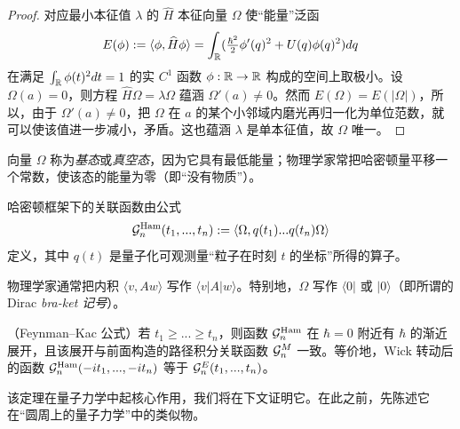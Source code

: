 \begin{proof} 对应最小本征值 $\lambda$ 的 $\widehat H$ 本征向量 $\Omega$ 使“能量”泛函
$$
E(\phi):=\langle\phi,\widehat H\phi\rangle=\int_{\Bbb R} (\tfrac{\hbar^2}{2}\phi'(q)^2+U(q)\phi(q)^2)dq
$$
在满足 $\int_{\Bbb R}\phi(t)^2dt=1$ 的实 $C^1$ 函数 $\phi: \Bbb R\to \Bbb R$ 构成的空间上取极小。设 $\Omega(a)=0$，则方程 $\widehat H\Omega=\lambda\Omega$ 蕴涵 $\Omega'(a)\ne 0$。然而 $E(\Omega)=E(|\Omega|)$，所以，由于 $\Omega'(a)\ne 0$，把 $\Omega$ 在 $a$ 的某个小邻域内磨光再归一化为单位范数，就可以使该值进一步减小，矛盾。这也蕴涵 $\lambda$ 是单本征值，故 $\Omega$ 唯一。
\end{proof}


\begin{remark} 向量 $\Omega$ 称为\emph{基态}或\emph{真空态}，因为它具有最低能量；物理学家常把哈密顿量平移一个常数，使该态的能量为零（即“没有物质”）。
\end{remark}

哈密顿框架下的关联函数由公式
$$
\G_n^{\rm Ham}(t_1,...,t_n):=\langle\Omega,q(t_1)...q(t_n)\Omega\rangle
$$
定义，其中 $q(t)$ 是量子化可观测量“粒子在时刻 $t$ 的坐标”所得的算子。

\begin{remark} 物理学家通常把内积 $\langle v,Aw\rangle$ 写作 $\langle v|A|w\rangle$。特别地，$\Omega$ 写作 $\langle 0|$ 或 $|0 \rangle$（即所谓的 Dirac \emph{bra-ket 记号}）。
\end{remark}

\begin{theorem}\label{FK} （Feynman–Kac 公式）若 $t_1\ge ...\ge t_n$，则函数 $\G_n^{\rm Ham}$ 在 $\hbar=0$ 附近有 $\hbar$ 的渐近展开，且该展开与前面构造的路径积分关联函数 $\G_n^M$ 一致。等价地，Wick 转动后的函数 $\G_n^{\rm Ham}(-it_1,...,-it_n)$ 等于 $\G_n^E(t_1,...,t_n)$。
\end{theorem}

该定理在量子力学中起核心作用，我们将在下文证明它。在此之前，先陈述它在“圆周上的量子力学”中的类似物。

